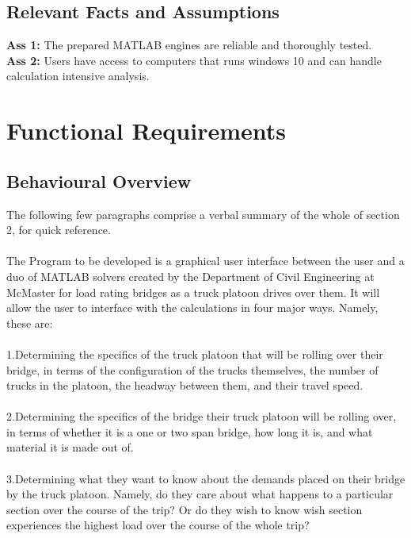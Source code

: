 \documentclass[12pt]{article}
\begin{document}
\subsection{Relevant Facts and Assumptions}
\textbf{Ass 1:} The prepared MATLAB engines are reliable and thoroughly tested.\\
\textbf{Ass 2:} Users have access to computers that runs windows 10 and can handle calculation intensive analysis.


\section{Functional Requirements}
\subsection{Behavioural Overview}
The following few paragraphs comprise a verbal summary of the whole of section 2, for quick reference.\\\\

\noindent The Program to be developed is a graphical user interface between the user and a duo of MATLAB solvers created by the Department of Civil Engineering at McMaster
for load rating bridges as a truck platoon drives over them. It will allow the user to interface with the calculations in four major ways. Namely, these are:\\\\ 

\noindent 1.Determining the specifics of the truck platoon that will be rolling over their bridge, in terms of the configuration of the trucks themselves, the number of trucks in
the platoon, the headway between them, and their travel speed.\\\\ 

\noindent 2.Determining the specifics of the bridge their truck platoon will be rolling over, in terms of whether it is a one or two span bridge, how long it is, and what 
material it is made out of.\\\\

\noindent 3.Determining what they want to know about the demands placed on their bridge by the truck platoon. Namely, do they care about what happens to a particular section 
over the course of the trip? Or do they wish to know wish section experiences the highest load over the course of the whole trip?\\\\
\end{document}
